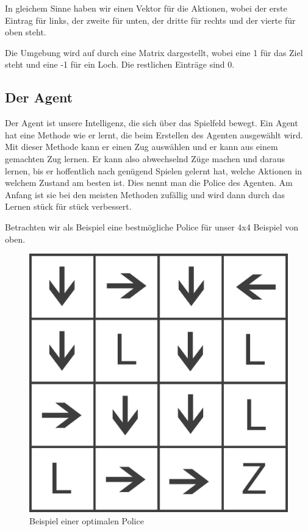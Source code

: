 In gleichem Sinne haben wir einen Vektor für die Aktionen, wobei der erste Eintrag für links, der zweite für unten, der dritte für rechts und der vierte für oben steht.

Die Umgebung wird auf durch eine Matrix dargestellt, wobei eine 1 für das Ziel steht und eine -1 für ein Loch. Die restlichen Einträge sind 0.

\subsection{Der Agent}
\label{subsec:agent}

Der Agent ist unsere Intelligenz, die sich über das Spielfeld bewegt. Ein Agent hat eine Methode wie er lernt, die beim Erstellen des Agenten ausgewählt wird. Mit dieser Methode kann er einen Zug auswählen und er kann aus einem gemachten Zug lernen. Er kann also abwechselnd Züge machen und daraus lernen, bis er hoffentlich nach genügend Spielen gelernt hat, welche Aktionen in welchem Zustand am besten ist. Dies nennt man die Police des Agenten. Am Anfang ist sie bei den meisten Methoden zufällig und wird dann durch das Lernen stück für stück verbessert.

Betrachten wir als Beispiel eine bestmögliche Police für unser 4x4 Beispiel von oben.

\begin{figure}[hbt!]
\centering
\includegraphics[width=\textwidth]{Figures/advanced1police.png}
\caption{Beispiel einer optimalen Police}
\label{police}
\end{figure}


